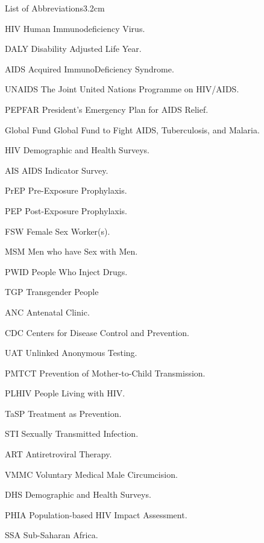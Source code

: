

\begin{mclistof}{List of Abbreviations}{3.2cm}

\item[HIV] Human Immunodeficiency Virus.
\item[DALY] Disability Adjusted Life Year.
\item[AIDS] Acquired ImmunoDeficiency Syndrome.
\item[UNAIDS] The Joint United Nations Programme on HIV/AIDS.
\item[PEPFAR] President’s Emergency Plan for AIDS Relief.
\item[Global Fund] Global Fund to Fight AIDS, Tuberculosis, and Malaria.
\item[HIV] Demographic and Health Surveys.
\item[AIS] AIDS Indicator Survey.
\item[PrEP] Pre-Exposure Prophylaxis.
\item[PEP] Post-Exposure Prophylaxis.
\item[FSW] Female Sex Worker(s).
\item[MSM] Men who have Sex with Men.
\item[PWID] People Who Inject Drugs.
\item[TGP] Transgender People
\item[ANC] Antenatal Clinic.
\item[CDC] Centers for Disease Control and Prevention.
\item[UAT] Unlinked Anonymous Testing.
\item[PMTCT] Prevention of Mother-to-Child Transmission.
\item[PLHIV] People Living with HIV.
\item[TaSP] Treatment as Prevention.
\item[STI] Sexually Transmitted Infection.
\item[ART] Antiretroviral Therapy.
\item[VMMC] Voluntary Medical Male Circumcision.
\item[DHS] Demographic and Health Surveys.
\item[PHIA] Population-based HIV Impact Assessment.
\item[SSA] Sub-Saharan Africa.


\end{mclistof}
